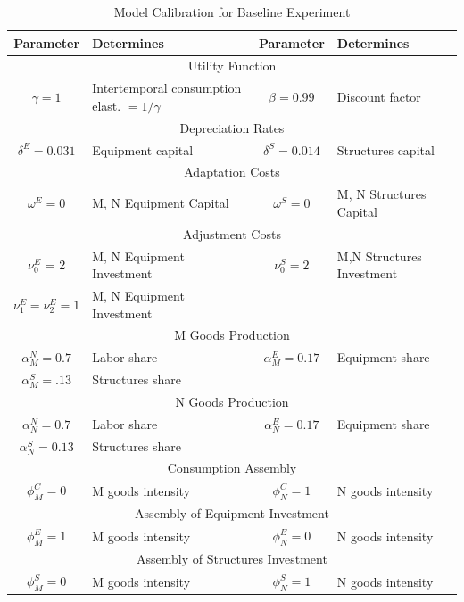 \documentclass[12pt,fleqn]{article}
\renewcommand{\baselinestretch}{1.5}
\begin{document}
\clearpage
\normalsize
\begin{table}[tbp] \caption{Model Calibration for Baseline Experiment}
\label{table_constantparameters} \center \renewcommand{%
\baselinestretch}{1.1} \footnotesize
\begin{tabular}{|c|l|c|l|}
\hline\hline Parameter & Determines & Parameter & Determines \\
\hline \multicolumn{4}{c}{Utility Function} \\ \hline $\gamma = 1$ &
Intertemporal consumption elast. $=1 / \gamma$ & $\beta = 0.99 $ &
Discount factor \\ \hline \multicolumn{4}{c}{Depreciation Rates} \\
\hline $\delta^E = 0.031 $ & Equipment capital & $\delta^S = 0.014 $
& Structures capital \\ \hline \multicolumn{4}{c}{Adaptation Costs}
\\ \hline $\omega^E = 0 $ & M, N Equipment Capital & $\omega^S = 0 $
& M, N Structures
Capital \\
\hline \multicolumn{4}{c}{Adjustment Costs} \\ \hline
$\nu^E_0$ = 2 & M, N Equipment Investment & $\nu^S_0 = 2 $ & M,N Structures Investment \\
$\nu^E_1=\nu^E_2=1$ & M, N Equipment Investment &  &  \\
\hline \multicolumn{4}{c}{M Goods Production} \\ \hline $\alpha^N_M
= 0.7 $ & Labor share & $\alpha^E_M = 0.17 $ & Equipment share
\\ $\alpha^S_M =.13 $ & Structures share &  &  \\
\hline \multicolumn{4}{c}{N Goods Production} \\ \hline
$\alpha^N_N = 0.7 $ & Labor share & $\alpha^E_N = 0.17$ & Equipment share \\
$\alpha^S_N = 0.13 $ & Structures share &  &  \\
\hline \multicolumn{4}{c}{Consumption Assembly} \\ \hline
$\phi^C_M = 0$ & M goods intensity & $\phi^C_N = 1$ & N goods intensity \\
\hline \multicolumn{4}{c}{Assembly of Equipment Investment} \\
\hline
$\phi^E_M = 1$ & M goods intensity & $\phi^E_N = 0$ & N goods intensity \\
\hline \multicolumn{4}{c}{Assembly of Structures Investment} \\
\hline
$\phi^S_M = 0$ & M goods intensity & $\phi^S_N = 1$ & N goods intensity \\
\hline\hline
\end{tabular}
\end{table}
\end{document}
